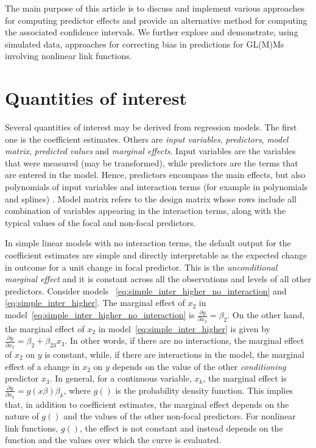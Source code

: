 \documentclass[10pt,letterpaper]{article}
\begin{document}
The main purpose of this article is to discuss and implement various approaches for computing predictor effects and provide an alternative method for computing the associated confidence intervals. We further explore and demonstrate, using simulated data, approaches for correcting bias in predictions for GL(M)Ms involving nonlinear link functions.


\section*{Quantities of interest}

Several quantities of interest may be derived from regression models. The first one is the coefficient estimates. Others are \emph{input variables},  \emph{predictors}, \emph{model matrix}, \emph{predicted values} and \emph{marginal effects}. Input variables are the variables that were measured (may be transformed), while predictors are the terms that are entered in the model. Hence, predictors encompass the main effects, but also polynomials of input variables and interaction terms (for example in polynomials and splines) \cite{schielzeth2010simple}. Model matrix refers to the design matrix whose rows include all combination of variables appearing in the interaction terms, along with the typical values of the focal and non-focal predictors.

In simple linear models with no interaction terms, the default output for the coefficient estimates are simple and directly interpretable as the expected change in outcome for a unit change in focal predictor. This is the \emph{unconditional marginal effect} \cite{leeper2017interpreting} and it is constant across all the observations and levels of all other predictors. Consider models ~\ref{eq:simple_inter_higher_no_interaction} and \ref{eq:simple_inter_higher}. The marginal effect of $x_2$ in model~\ref{eq:simple_inter_higher_no_interaction} is $\frac{\partial y}{\partial x_2} = \beta_2$. On the other hand, the marginal effect of $x_2$ in model~\ref{eq:simple_inter_higher} is given by $\frac{\partial y}{\partial x_2} = \beta_2 + \beta_{23}x_3$. In other words, if there are no interactions, the marginal effect of $x_2$ on $y$ is constant, while, if there are interactions in the model, the marginal effect of a change in $x_2$ on $y$ depends on the value of the other \emph{conditioning} predictor $x_3$. In general, for a continuous variable, $x_k$, the marginal effect is $\frac{\partial y}{\partial x_k} = g(x\beta)\beta_k$, where $g()$ is the probability density function. This implies that, in addition to coefficient estimates, the marginal effect depends on the nature of $g()$ and the values of the other non-focal predictors. For nonlinear link functions, $g()$, the effect is not constant and instead depends on the function and the values over which the curve is evaluated.
\end{document}
